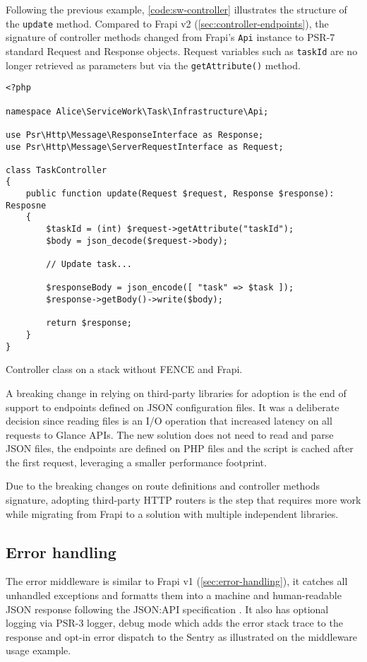 Following the previous example, \autoref{code:sw-controller} illustrates the structure of the \texttt{update} method. Compared to Frapi v2 (\autoref{sec:controller-endpoints}), the signature of controller methods changed from Frapi's \texttt{Api} instance to PSR-7 standard Request and Response objects. Request variables such as \texttt{taskId} are no longer retrieved as parameters but via the \texttt{getAttribute()} method.

\begin{listing}[htbp]
\begin{verbatim}
<?php

namespace Alice\ServiceWork\Task\Infrastructure\Api;

use Psr\Http\Message\ResponseInterface as Response;
use Psr\Http\Message\ServerRequestInterface as Request;

class TaskController
{
	public function update(Request $request, Response $response): Resposne
	{
		$taskId = (int) $request->getAttribute("taskId");
		$body = json_decode($request->body);

		// Update task...

		$responseBody = json_encode([ "task" => $task ]);
		$response->getBody()->write($body);
	
		return $response;
	}
}
\end{verbatim}
\caption{Controller class on a stack without FENCE and Frapi.}
\label{code:sw-controller}
\end{listing}

A breaking change in relying on third-party libraries for adoption is the end of support to endpoints defined on JSON configuration files. It was a deliberate decision since reading files is an I/O operation that increased latency on all requests to Glance APIs. The new solution does not need to read and parse JSON files, the endpoints are defined on PHP files and the script is cached after the first request, leveraging a smaller performance footprint.

Due to the breaking changes on route definitions and controller methods signature, adopting third-party HTTP routers is the step that requires more work while migrating from Frapi to a solution with multiple independent libraries.

\subsection{Error handling}

The error middleware \cite{error-middleware} is similar to Frapi v1 (\autoref{sec:error-handling}), it catches all unhandled exceptions and formatts them into a machine and human-readable JSON response following the JSON:API specification \cite{json-api-error}. It also has optional logging via PSR-3 logger, debug mode which adds the error stack trace to the response and opt-in error dispatch to the Sentry \cite{sentry-about} \cite{sentry-php-sdk} as illustrated on the middleware usage example.

